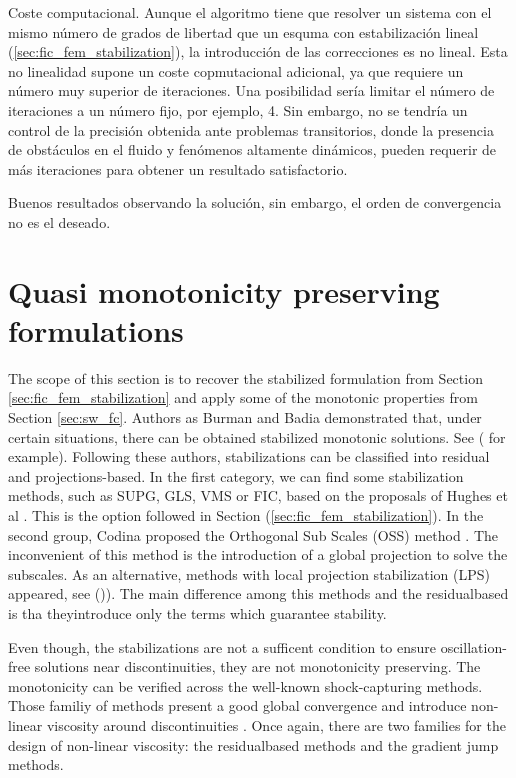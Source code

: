 Coste computacional. Aunque el algoritmo tiene que resolver un sistema con el mismo número de grados de libertad que un esquma con estabilización lineal (\ref{sec:fic_fem_stabilization}), la introducción de las correcciones es no lineal. Esta no linealidad supone un coste copmutacional adicional, ya que requiere un número muy superior de iteraciones. Una posibilidad sería limitar el número de iteraciones a un número fijo, por ejemplo, 4. Sin embargo, no se tendría un control de la precisión obtenida ante problemas transitorios, donde la presencia de obstáculos en el fluido y fenómenos altamente dinámicos, pueden requerir de más iteraciones para obtener un resultado satisfactorio.

Buenos resultados observando la solución, sin embargo, el orden de convergencia no es el deseado.





\section{Quasi monotonicity preserving formulations}
\label{sec:monotonic}



The scope of this section is to recover the stabilized formulation from Section \ref{sec:fic_fem_stabilization} and apply some of the monotonic properties from Section \ref{sec:sw_fc}. Authors as Burman and Badia demonstrated that, under certain situations, there can be obtained stabilized monotonic solutions. See (\cite{burman2007, burman2010, badia2014} for example).
Following these authors, stabilizations can be classified into residual and projections-based. In the first category, we can find some stabilization methods, such as SUPG, GLS, VMS or FIC, based on the proposals of Hughes et al \cite{brooks1982,hughes1989,hughes1995}. This is the option followed in Section (\ref{sec:fic_fem_stabilization}). 
In the second group, Codina proposed the Orthogonal Sub Scales (OSS) method \cite{codina2000}. The inconvenient of this method is the introduction of a global projection to solve the subscales. As an alternative, methods with local projection stabilization (LPS) appeared, see (\cite{braak2006,badia2012,badia2014,burman2015,matthies2007})). The main difference among this methods and the residualbased is tha theyintroduce only the terms which guarantee stability.

Even though, the stabilizations are not a sufficent condition to ensure oscillation-free solutions near discontinuities, they are not monotonicity preserving. The monotonicity can be verified across the well-known shock-capturing methods.
Those familiy of methods present a good global convergence and introduce non-linear viscosity around discontinuities \cite{Johnson1990}.
Once again, there are two families for the design of non-linear viscosity: the residualbased methods and the gradient jump methods.

